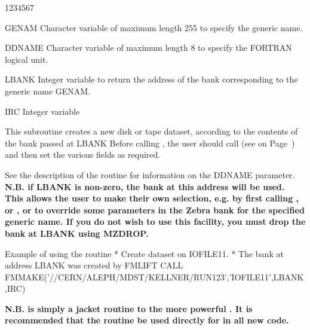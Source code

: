 \begin{DLtt}{1234567}
\item[GENAM]
Character variable of maximum length 255 to specify the generic name.
\item[DDNAME]
Character variable of maximum length 8 to specify the FORTRAN logical
unit.
\item[LBANK]
Integer variable to return the address of the bank corresponding
to the generic name GENAM.
\item[IRC]
Integer variable
\end{DLtt}

This subroutine creates a new disk or tape dataset, according to the
contents of the bank passed at LBANK
Before calling , the user should call
 (see on Page~\pageref{FMBOOK}) 
and then set the various fields as required.

See the description of the  routine for information on the DDNAME
parameter.
{\bf N.B. if LBANK is non-zero, the bank at this address
will be used. This allows the user to make their own
selection, e.g. by first calling ,  or , or to override
some parameters in the Zebra bank for the specified generic name.
If you do not wish to use this facility, you must drop the
bank at LBANK using MZDROP.}
\begin{XMPt} {Example of using the routine \protect{}}
*     Create dataset on IOFILE11.
*     The bank at address LBANK was created by FMLIFT
      CALL FMMAKE('//CERN/ALEPH/MDST/KELLNER/RUN123','IOFILE11',LBANK,IRC)
\end{XMPt}

{\bf N.B.  is simply a jacket routine to the
more powerful . It is recommended that the
routine  be used directly for in all new code.}

